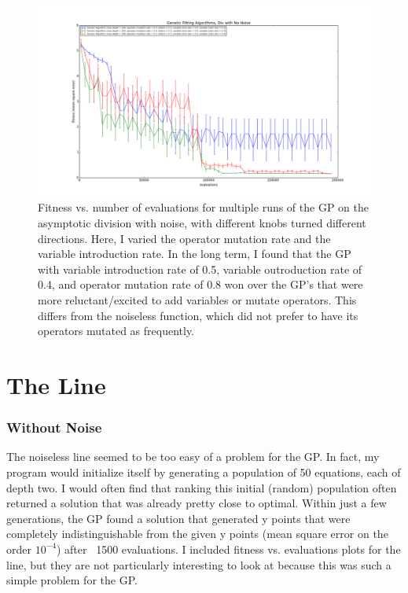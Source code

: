 \documentclass[11pt,amsmath,amssymb]{revtex4}
\begin{document}
\begin{figure}[H]
\center
\includegraphics[scale=0.35]{Div_Noise_Comparison.png}
\caption{Fitness vs. number of evaluations for multiple runs of the GP on the asymptotic division with noise, with different knobs turned different directions. Here, I varied the operator mutation rate and the variable introduction rate. In the long term, I found that the GP with variable introduction rate of 0.5, variable outroduction rate of 0.4, and operator mutation rate of 0.8 won over the GP's that were more reluctant/excited to add variables or mutate operators. This differs from the noiseless function, which did not prefer to have its operators mutated as frequently.}
\label{q1}
\end{figure}


\section{The Line}
\subsubsection{Without Noise}
The noiseless line seemed to be too easy of a problem for the GP. In fact, my program would initialize itself by generating a population of 50 equations, each of depth two. I would often find that ranking this initial (random) population often returned a solution that was already pretty close to optimal. Within just a few generations, the GP found a solution that generated y points that were completely indistinguishable from the given y points (mean square error on the order $10^{-4}$) after ~1500 evaluations. I included fitness vs. evaluations plots for the line, but they are not particularly interesting to look at because this was such a simple problem for the GP.
\end{document}
